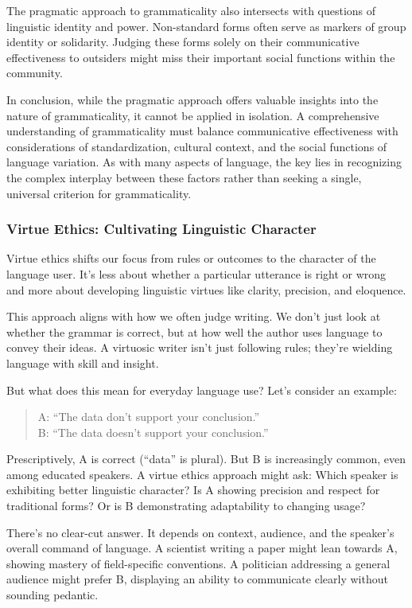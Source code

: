 The pragmatic approach to grammaticality also intersects with questions of linguistic identity and power. Non-standard forms often serve as markers of group identity or solidarity. Judging these forms solely on their communicative effectiveness to outsiders might miss their important social functions within the community.

In conclusion, while the pragmatic approach offers valuable insights into the nature of grammaticality, it cannot be applied in isolation. A comprehensive understanding of grammaticality must balance communicative effectiveness with considerations of standardization, cultural context, and the social functions of language variation. As with many aspects of language, the key lies in recognizing the complex interplay between these factors rather than seeking a single, universal criterion for grammaticality.

\subsubsection{Virtue Ethics: Cultivating Linguistic Character}

Virtue ethics shifts our focus from rules or outcomes to the character of the language user. It's less about whether a particular utterance is right or wrong and more about developing linguistic virtues like clarity, precision, and eloquence.

This approach aligns with how we often judge writing. We don't just look at whether the grammar is correct, but at how well the author uses language to convey their ideas. A virtuosic writer isn't just following rules; they're wielding language with skill and insight.

But what does this mean for everyday language use? Let's consider an example:

\begin{quote}
A: ``The data don't support your conclusion.''\\
B: ``The data doesn't support your conclusion.''
\end{quote}

Prescriptively, A is correct (``data'' is plural). But B is increasingly common, even among educated speakers. A virtue ethics approach might ask: Which speaker is exhibiting better linguistic character? Is A showing precision and respect for traditional forms? Or is B demonstrating adaptability to changing usage?

There's no clear-cut answer. It depends on context, audience, and the speaker's overall command of language. A scientist writing a paper might lean towards A, showing mastery of field-specific conventions. A politician addressing a general audience might prefer B, displaying an ability to communicate clearly without sounding pedantic.

